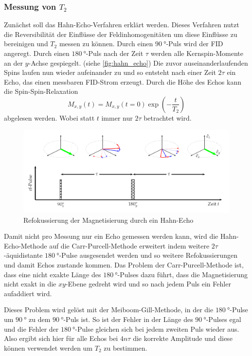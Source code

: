 \subsubsection{Messung von \texorpdfstring{$T_2$}{T2}}
\label{sssec:T2_Messung}

Zunächst soll das Hahn-Echo-Verfahren erklärt werden.
Dieses Verfahren nutzt die Reversibilität der Einflüsse der Feldinhomogenitäten um diese Einflüsse zu bereinigen und $T_2$ messen zu können.
Durch einen $\SI{90}{\degree}$-Puls wird der FID angeregt.
Durch einen $\SI{180}{\degree}$-Puls nach der Zeit $\tau$ werden alle Kernspin-Momente an der $y$-Achse gespiegelt. (siehe \autoref{fig:hahn_echo})
Die zuvor auseinanderlaufenden Spins laufen nun wieder aufeinander zu und so entsteht nach einer Zeit $2\tau$ ein Echo, das einen messbaren FID-Strom erzeugt.
Durch die Höhe des Echos kann die Spin-Spin-Relaxation 
\begin{equation}
    M_{x,y}(t) = M_{x,y}(t=0) \exp\left(-\frac{t}{T_2}\right)
\end{equation}
abgelesen werden. Wobei statt $t$ immer nur $2\tau$ betrachtet wird.

\begin{figure}
    \centering
    \includegraphics[width=\textwidth]{images/hahn_echo_2.png}
    \caption{Refokussierung der Magnetisierung durch ein Hahn-Echo \cite{V49}}
    \label{fig:hahn_echo}
\end{figure}

Damit nicht pro Messung nur ein Echo gemessen werden kann, wird die Hahn-Echo-Methode auf die Carr-Purcell-Methode erweitert
indem weitere $2\tau$-äquidistante $\SI{180}{\degree}$-Pulse ausgesendet werden 
und so weitere Refokussierungen und damit Echos zustande kommen.
Das Problem der Carr-Purcell-Methode ist, dass eine nicht exakte Länge des $\SI{180}{\degree}$-Pulses
dazu führt, dass die Magnetisierung nicht exakt in die $xy$-Ebene gedreht wird und so nach jedem Puls ein Fehler aufaddiert wird.

Dieses Problem wird gelöst mit der Meiboom-Gill-Methode, in der die $\SI{180}{\degree}$-Pulse um $\SI{90}{\degree}$ zu dem $\SI{90}{\degree}$-Puls ist.
So ist der Fehler in der Länge des $\SI{90}{\degree}$-Pulses egal und die Fehler der $\SI{180}{\degree}$-Pulse gleichen sich bei jedem zweiten Puls wieder aus.
Also ergibt sich hier für alle Echos bei $4n\tau$ die korrekte Amplitude und diese können verwendet werden um $T_2$ zu bestimmen.